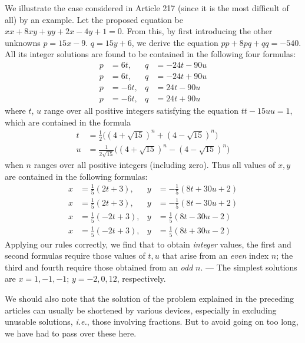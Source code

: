 We illustrate the case considered in Article 217 (since it is the most difficult of all) by an example. Let the proposed equation be $xx+8xy+yy+2x-4y+1=0$. From this, by first introducing the other unknowns $p=15x-9$. $q=15y+6$, we derive the equation $pp+8pq+qq=-540$. All its integer solutions are found to be contained in the following four formulas:
\[
\begin{aligned}
p&=6t,&q&=-24t-90u\\
p&=6t,&q&=-24t+90u\\
p&=-6t,&q&=24t-90u\\
p&=-6t,&q&=24t+90u
\end{aligned}
\]
where $t$, $u$ range over all positive integers satisfying the equation
$tt-15uu=1$, which are contained in the formula
\[
\begin{aligned}
t&=\tfrac{1}{2}\bigl((4+\sqrt{15})^n+(4-\sqrt{15})^n\bigr)\\
u&=\frac{1}{2\sqrt{15}}\bigl((4+\sqrt{15})^n-(4-\sqrt{15})^n\bigr)
\end{aligned}
\]
when $n$ ranges over all positive integers (including zero). Thus all values of $x,y$ are contained in the following formulas:
\[
\begin{aligned}
x&=\tfrac{1}{5}(2t+3),&y&=-\tfrac{1}{5}(8t+30u+2)\\
x&=\tfrac{1}{5}(2t+3),&y&=-\tfrac{1}{5}(8t-30u+2)\\
x&=\tfrac{1}{5}(-2t+3),&y&=\tfrac{1}{5}(8t-30u-2)\\
x&=\tfrac{1}{5}(-2t+3),&y&=\tfrac{1}{5}(8t+30u-2)
\end{aligned}
\]
Applying our rules correctly, we find that to obtain \textit{integer} values, the first and second formulas require those values of $t,u$ that arise from an \textit{even} index $n$; the third and fourth require those obtained from an \textit{odd} $n$. --- The simplest solutions are $x=1,-1,-1$; $y=-2,0,12$, respectively.

We should also note that the solution of the problem explained in the preceding articles can usually be shortened by various devices, especially in excluding unusable solutions, \textit{i.e.}, those involving fractions. But to avoid going on too long, we have had to pass over these here.

